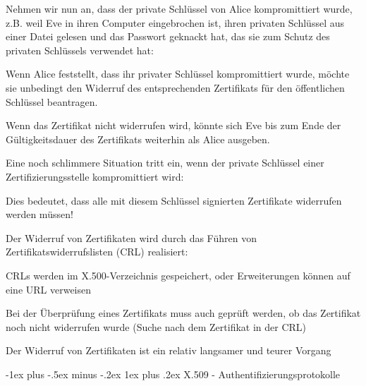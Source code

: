 \documentclass[a4paper]{article}
\makeatletter
\renewcommand{\subsubsection}{\@startsection{subsubsection}{3}{0mm}%
 {-1ex plus -.5ex minus -.2ex}%
 {1ex plus .2ex}%
 {\normalfont\small\bfseries}}
\makeatother
\begin{document}
\begin{multicols}{3}
      \begin{itemize*}
            \item Nehmen wir nun an, dass der private Schlüssel von Alice kompromittiert
            wurde, z.B. weil Eve in ihren Computer eingebrochen ist, ihren
            privaten Schlüssel aus einer Datei gelesen und das Passwort geknackt
            hat, das sie zum Schutz des privaten Schlüssels verwendet hat:
            \begin{itemize*}
                  \item Wenn Alice feststellt, dass ihr privater Schlüssel kompromittiert wurde, möchte sie unbedingt den Widerruf des entsprechenden Zertifikats für den öffentlichen Schlüssel beantragen.
                  \item Wenn das Zertifikat nicht widerrufen wird, könnte sich Eve bis zum Ende der Gültigkeitsdauer des Zertifikats weiterhin als Alice ausgeben.
            \end{itemize*}
            \item Eine noch schlimmere Situation tritt ein, wenn der private Schlüssel
            einer Zertifizierungsstelle kompromittiert wird:
            \begin{itemize*}
                  \item Dies bedeutet, dass alle mit diesem Schlüssel signierten Zertifikate widerrufen werden müssen!
            \end{itemize*}
            \item Der Widerruf von Zertifikaten wird durch das Führen von
            Zertifikatswiderrufslisten (CRL) realisiert:
            \begin{itemize*}
                  \item CRLs werden im X.500-Verzeichnis gespeichert, oder Erweiterungen können auf eine URL verweisen
                  \item Bei der Überprüfung eines Zertifikats muss auch geprüft werden, ob das Zertifikat noch nicht widerrufen wurde (Suche nach dem Zertifikat in der CRL)
                  \item Der Widerruf von Zertifikaten ist ein relativ langsamer und teurer Vorgang
            \end{itemize*}
      \end{itemize*}


      \subsubsection{X.509 -
            Authentifizierungsprotokolle}


\end{multicols}
\end{document}
